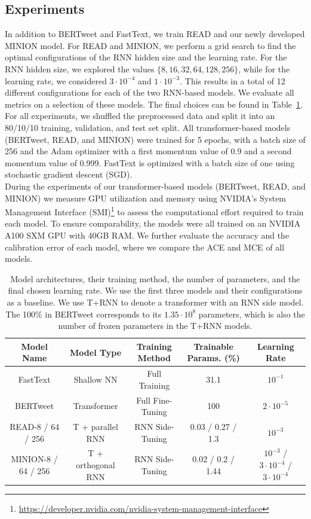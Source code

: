 \documentclass[10pt,conference,compsocconf]{IEEEtran}
\begin{document}
\subsection{Experiments}
In addition to BERTweet and FastText, we train READ and our newly developed MINION model. For READ and MINION, we perform a grid search to find the optimal configurations of the RNN hidden size and the learning rate. For the RNN hidden size, we explored the values $\{8, 16, 32, 64, 128, 256\}$, while for the learning rate, we considered $3\cdot 10^{-4}$ and $1\cdot 10^{-3}$. This results in a total of 12 different configurations for each of the two RNN-based models. We evaluate all metrics on a selection of these models. The final choices can be found in Table~\ref{tab:model-overview}. 
For all experiments, we shuffled the preprocessed data and split it into an 80/10/10 training, validation, and test set split. All transformer-based models (BERTweet, READ, and MINION) were trained for 5 epochs, with a batch size of 256 and the Adam optimizer \cite{kingma2017adam} with a first momentum value of 0.9 and a second momentum value of 0.999. FastText is optimized with a batch size of one using stochastic gradient descent (SGD). \\
During the experiments of our transformer-based models (BERTweet, READ, and MINION) we measure GPU utilization and memory using NVIDIA's System Management Interface (SMI)\footnote{\url{https://developer.nvidia.com/nvidia-system-management-interface}} to assess the computational effort required to train each model. To ensure comparability, the models were all trained on an NVIDIA A100 SXM GPU with 40GB RAM. We further evaluate the accuracy and the calibration error of each model, where we compare the ACE and MCE of all models.

\begin{table}[htbp]
    \centering
    \begin{tabular}[H]{|c||c|c|c|c|}
        \hline
        Model Name & Model Type & Training Method & Trainable Params. (\%) & Learning Rate \\
        \hline
        FastText & Shallow NN & Full Training & 31.1 & $10^{-1}$ \\
        BERTweet & Transformer & Full Fine-Tuning & 100 & $2 \cdot 10^{-5}$\\
        READ-8 / 64 / 256 & T + parallel RNN & RNN Side-Tuning & 0.03 / 0.27 / 1.3 & $10^{-3}$ \\
        \hline
        MINION-8 / 64 / 256 & T + orthogonal RNN & RNN Side-Tuning & 0.02 / 0.2 / 1.44 & $10^{-3}$ / $3\cdot10^{-4}$ / $3\cdot10^{-4}$\\
        \hline
    \end{tabular}
    \caption{Model architectures, their training method, the number of parameters, and the final chosen learning rate. We use the first three models and their configurations as a baseline. We use T+RNN to denote a transformer with an RNN side model.  The 100\% in BERTweet corresponds to its $1.35 \cdot 10^8$ parameters, which is also the number of frozen parameters in the T+RNN models.}
    \label{tab:model-overview}
\end{table}
\end{document}
